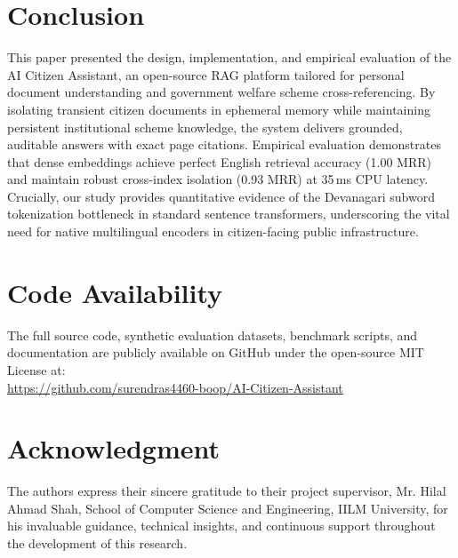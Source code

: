 \documentclass[conference]{IEEEtran}
\begin{document}
\section{Conclusion}
This paper presented the design, implementation, and empirical evaluation of the AI Citizen Assistant, an open-source RAG platform tailored for personal document understanding and government welfare scheme cross-referencing. By isolating transient citizen documents in ephemeral memory while maintaining persistent institutional scheme knowledge, the system delivers grounded, auditable answers with exact page citations. Empirical evaluation demonstrates that dense embeddings achieve perfect English retrieval accuracy (1.00 MRR) and maintain robust cross-index isolation (0.93 MRR) at 35\,ms CPU latency. Crucially, our study provides quantitative evidence of the Devanagari subword tokenization bottleneck in standard sentence transformers, underscoring the vital need for native multilingual encoders in citizen-facing public infrastructure.

\section*{Code Availability}
The full source code, synthetic evaluation datasets, benchmark scripts, and documentation are publicly available on GitHub under the open-source MIT License at: \\
\url{https://github.com/surendras4460-boop/AI-Citizen-Assistant}

\section*{Acknowledgment}
The authors express their sincere gratitude to their project supervisor, Mr. Hilal Ahmad Shah, School of Computer Science and Engineering, IILM University, for his invaluable guidance, technical insights, and continuous support throughout the development of this research.
\end{document}
